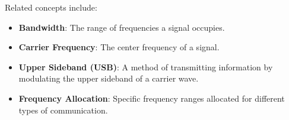 Related concepts include:
\begin{itemize}
    \item \textbf{Bandwidth}: The range of frequencies a signal occupies.
    \item \textbf{Carrier Frequency}: The center frequency of a signal.
    \item \textbf{Upper Sideband (USB)}: A method of transmitting information by modulating the upper sideband of a carrier wave.
    \item \textbf{Frequency Allocation}: Specific frequency ranges allocated for different types of communication.
\end{itemize}


